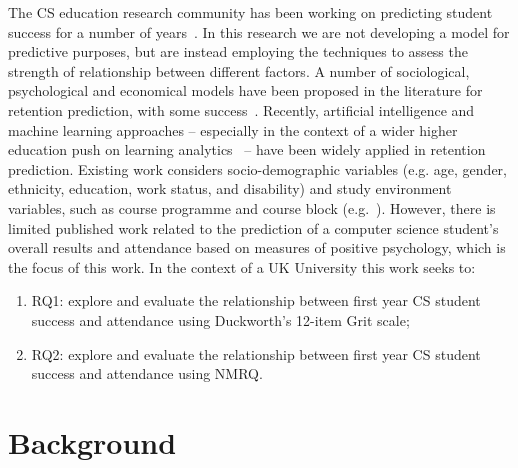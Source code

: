 \documentclass[sigconf]{acmart}
\begin{document}

 The CS education research community has been working on predicting student success for a number of years~\cite{Robins2010}. In this research we are not developing a model for predictive purposes, but are instead employing the techniques to assess the strength of relationship between different factors. A number of sociological, psychological and economical models have been proposed in the literature for retention prediction, with some success~\cite{Seidman2012}. Recently, artificial intelligence and machine learning approaches -- especially in the context of a wider higher education push on learning analytics~\cite{jiscla:2020} -- have been widely applied in retention prediction. Existing work considers socio-demographic variables (e.g. age, gender, ethnicity, education, work status, and disability) and study environment variables, such as course programme and course block (e.g.~\cite{Liao:2019:EVD:3287324.3287407}). However, there is limited published work related to the prediction of a computer science student's overall results and attendance based on measures of positive psychology, which is the focus of this work. In the context of a UK University this work seeks to:
\begin{enumerate}
    \item RQ1: explore and evaluate the relationship between first year CS student success and attendance using Duckworth's 12-item Grit scale;
    \item RQ2: explore and evaluate the relationship between first year CS student success and attendance using NMRQ.
\end{enumerate}

\section {Background}

\end{document}

